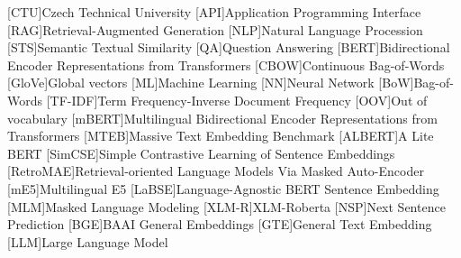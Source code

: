 
\begin{acronym}
  [CTU]{Czech Technical University}
  [API]{Application Programming Interface}
  [RAG]{Retrieval-Augmented Generation}
  [NLP]{Natural Language Procession}
  [STS]{Semantic Textual Similarity}
  [QA]{Question Answering}
  [BERT]{Bidirectional Encoder Representations from Transformers}
  [CBOW]{Continuous Bag-of-Words}
  [GloVe]{Global vectors}
  [ML]{Machine Learning}
  [NN]{Neural Network}
  [BoW]{Bag-of-Words}
  [TF-IDF]{Term Frequency-Inverse Document Frequency}
  [OOV]{Out of vocabulary}
  [mBERT]{Multilingual Bidirectional Encoder Representations from Transformers}
  [MTEB]{Massive Text Embedding Benchmark}
  [ALBERT]{A Lite BERT}
  [SimCSE]{Simple Contrastive Learning of Sentence Embeddings}
  [RetroMAE]{Retrieval-oriented Language Models Via Masked Auto-Encoder}
  [mE5]{Multilingual E5}
  [LaBSE]{Language-Agnostic BERT Sentence Embedding}
  [MLM]{Masked Language Modeling}
  [XLM-R]{XLM-Roberta}
  [NSP]{Next Sentence Prediction}
  [BGE]{BAAI General Embeddings}
  [GTE]{General Text Embedding}
  [LLM]{Large Language Model}
\end{acronym}


